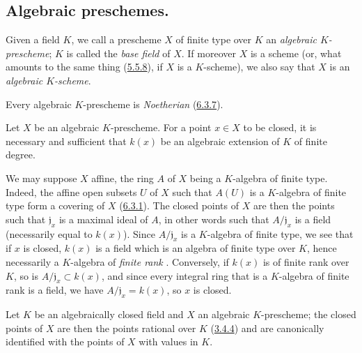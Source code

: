 \subsection{Algebraic preschemes.}
\label{subsection:I.6.4}

\begin{definition}[6.4.1]
\label{I.6.4.1}
Given a field $K$, we call a prescheme $X$ of finite type over $K$ an
\emph{algebraic $K$-prescheme}; $K$ is called the \emph{base field}
of $X$. If moreover $X$ is a scheme (or, what amounts to the same thing
(\hyperref[I.5.5.8]{5.5.8}), if $X$ is a $K$-scheme), we also say that
$X$ is an \emph{algebraic $K$-scheme}.
\end{definition}

Every algebraic $K$-prescheme is \emph{Noetherian}
(\hyperref[I.6.3.7]{6.3.7}).

\begin{proposition}[6.4.2]
\label{I.6.4.2}
Let $X$ be an algebraic $K$-prescheme. For a point $x\in X$ to be closed, it
is necessary and sufficient that $k(x)$ be an algebraic extension of $K$ of
finite degree.
\end{proposition}

We may suppose $X$ affine, the ring $A$ of $X$ being a $K$-algebra of finite
type. Indeed, the affine open subsets $U$ of $X$ such that $A(U)$ is a
$K$-algebra of finite type form a covering of $X$
(\hyperref[I.6.3.1]{6.3.1}). The closed points of $X$ are then the points
such that $\mathfrak{j}_x$ is
a maximal ideal of $A$, in other words such that $A/\mathfrak{j}_x$ is a
field (necessarily equal to $k(x)$). Since $A/\mathfrak{j}_x$ is a
$K$-algebra of finite type, we see that if $x$ is closed, $k(x)$ is a field
which is an algebra of finite type over $K$, hence necessarily a $K$-algebra
of \emph{finite rank} \cite{I-21}. Conversely, if $k(x)$ is of finite rank
over $K$, so is $A/\mathfrak{j}_x\subset k(x)$, and since every integral ring
that is a $K$-algebra of finite rank is a field, we have
$A/\mathfrak{j}_x=k(x)$, so $x$ is closed.

\begin{corollary}[6.4.3]
\label{I.6.4.3}
Let $K$ be an algebraically closed field and $X$ an algebraic $K$-prescheme;
the closed points of $X$ are then the points rational over $K$
(\hyperref[I.3.4.4]{3.4.4}) and are canonically identified with the points
of $X$ with values in $K$.
\end{corollary}

